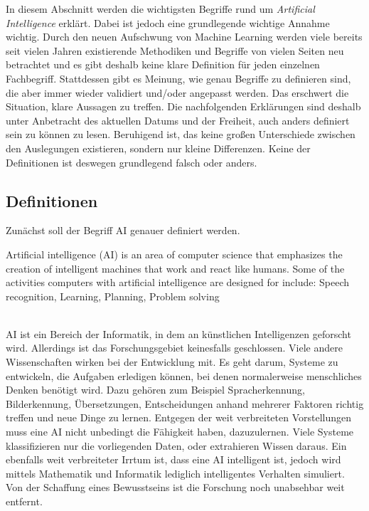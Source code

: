 In diesem Abschnitt werden die wichtigsten Begriffe rund um \textit{Artificial Intelligence} erklärt. Dabei ist jedoch eine grundlegende wichtige Annahme wichtig. Durch den neuen Aufschwung von Machine Learning werden viele bereits seit vielen Jahren existierende Methodiken und Begriffe von vielen Seiten neu betrachtet und es gibt deshalb keine klare Definition für jeden einzelnen Fachbegriff. Stattdessen gibt es Meinung, wie genau Begriffe zu definieren sind, die aber immer wieder validiert und/oder angepasst werden. Das erschwert die Situation, klare Aussagen zu treffen. Die nachfolgenden Erklärungen sind deshalb unter Anbetracht des aktuellen Datums und der Freiheit, auch anders definiert sein zu können zu lesen. Beruhigend ist, das keine großen Unterschiede zwischen den Auslegungen existieren, sondern nur kleine Differenzen. Keine der Definitionen ist deswegen grundlegend falsch oder anders.

\subsection{Definitionen} 

Zunächst soll der Begriff AI genauer definiert werden. \\

\begin{addmargin}[25pt]{0pt} 
\glqq Artificial intelligence (AI) is an area of computer science that emphasizes the creation of intelligent machines that work and react like humans. Some of the activities computers with artificial intelligence are designed for include: Speech recognition, Learning, Planning, Problem solving\grqq \cite{F_AIDfinition_3.3.1}
\end{addmargin}

\ \\ AI ist ein Bereich der Informatik, in dem an künstlichen Intelligenzen geforscht wird. Allerdings ist das Forschungsgebiet keinesfalls geschlossen. Viele andere Wissenschaften wirken bei der Entwicklung mit. Es geht darum, Systeme zu entwickeln, die Aufgaben erledigen können, bei denen normalerweise menschliches Denken benötigt wird. Dazu gehören zum Beispiel Spracherkennung, Bilderkennung, Übersetzungen, Entscheidungen anhand mehrerer Faktoren richtig treffen und neue Dinge zu lernen. Entgegen der weit verbreiteten Vorstellungen muss eine AI nicht unbedingt die Fähigkeit haben, dazuzulernen. Viele Systeme klassifizieren \glqq nur\grqq{} die vorliegenden Daten, oder extrahieren Wissen daraus. Ein ebenfalls weit verbreiteter Irrtum ist, dass eine AI intelligent ist, jedoch wird mittels Mathematik und Informatik lediglich intelligentes Verhalten simuliert. Von der Schaffung eines Bewusstseins ist die Forschung noch unabsehbar weit entfernt.

